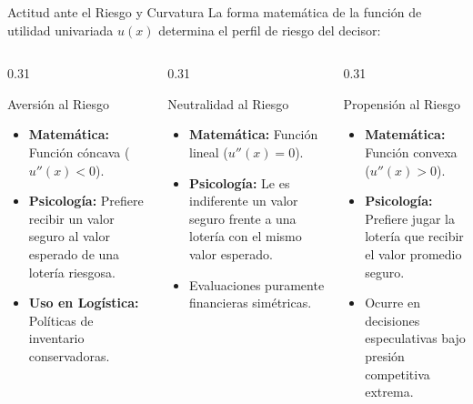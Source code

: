 \documentclass[aspectratio=169, 10pt]{beamer}
\begin{document}
\begin{frame}{Actitud ante el Riesgo y Curvatura}
    La forma matemática de la función de utilidad univariada $u(x)$ determina el perfil de riesgo del decisor:
    \begin{columns}[T]
        \begin{column}{0.31\textwidth}
            \begin{block}{Aversión al Riesgo}
                \scriptsize
                \begin{itemize}
                    \item \textbf{Matemática:} Función cóncava ($u''(x) < 0$).
                    \item \textbf{Psicología:} Prefiere recibir un valor seguro al valor esperado de una lotería riesgosa.
                    \item \textbf{Uso en Logística:} Políticas de inventario conservadoras.
                \end{itemize}
            \end{block}
        \end{column}
        
        \begin{column}{0.31\textwidth}
            \begin{exampleblock}{Neutralidad al Riesgo}
                \scriptsize
                \begin{itemize}
                    \item \textbf{Matemática:} Función lineal ($u''(x) = 0$).
                    \item \textbf{Psicología:} Le es indiferente un valor seguro frente a una lotería con el mismo valor esperado.
                    \item Evaluaciones puramente financieras simétricas.
                \end{itemize}
            \end{exampleblock}
        \end{column}
        
        \begin{column}{0.31\textwidth}
            \begin{alertblock}{Propensión al Riesgo}
                \scriptsize
                \begin{itemize}
                    \item \textbf{Matemática:} Función convexa ($u''(x) > 0$).
                    \item \textbf{Psicología:} Prefiere jugar la lotería que recibir el valor promedio seguro.
                    \item Ocurre en decisiones especulativas bajo presión competitiva extrema.
                \end{itemize}
            \end{alertblock}
        \end{column}
    \end{columns}
\end{frame}
\end{document}
